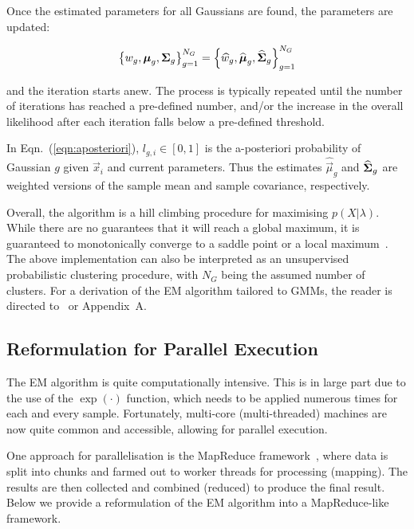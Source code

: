 \noindent
Once the estimated parameters for all Gaussians are found, the parameters are updated:

\begin{equation}
\left\{ w_g, {\boldsymbol{\mu}}_g, {\boldsymbol{\Sigma}}_g \right\}_{g=1}^{N_G} = \left\{ \widehat{w}_g, \widehat{{\boldsymbol{\mu}}}_g, \widehat{{\boldsymbol{\Sigma}}}_g \right\}_{g=1}^{N_G}
\end{equation}

\noindent and the iteration starts anew.
The process is typically repeated until the number of iterations has reached a pre-defined number,
and/or the increase in the overall likelihood after each iteration falls below a pre-defined threshold.

In Eqn.~(\ref{eqn:aposteriori}), $l_{g,i} \in [0,1]$ is the {a-posteriori} probability of Gaussian $g$ given $\Vec{x}_i$ and current parameters.
Thus the estimates $\widehat{\Vec{\mu}}_g$ and $\widehat{{\boldsymbol{\Sigma}}}_g$ are weighted versions of the
sample mean and sample covariance, respectively.

Overall, the algorithm is a hill climbing procedure for maximising $p(X | \lambda)$.
While there are no guarantees that it will reach a global maximum, it is guaranteed to monotonically converge to a saddle point or a local maximum~\cite{Dempster77,Duda01,Mitchell97}.
The above implementation can also be interpreted as an unsupervised probabilistic clustering procedure,
with $N_G$ being the assumed number of clusters.
For a derivation of the EM algorithm tailored to GMMs, the reader is directed to~\cite{Bilmes98,Redner84} or Appendix~A. %


\subsection{Reformulation for Parallel Execution}
\label{sec:param_em_parallel}

The EM algorithm is quite computationally intensive.
This is in large part due to the use of the $\exp(\cdot)$ function, which needs to be applied numerous times for each and every sample.
Fortunately, multi-core (multi-threaded) machines are now quite common and accessible, allowing for parallel execution.

One approach for parallelisation is the MapReduce framework~\cite{MapReduce_2004},
where data is split into chunks and farmed out to worker threads for processing (mapping).
The results are then collected and combined (reduced) to produce the final result.
Below we provide a reformulation of the EM algorithm into a MapReduce-like framework.

